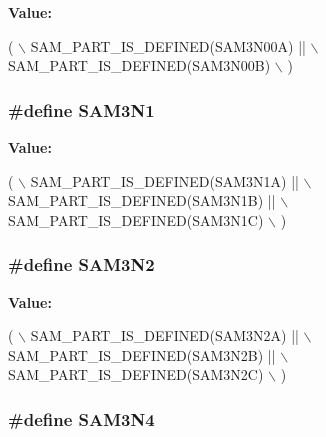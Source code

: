 {\bfseries Value\-:}
\begin{DoxyCode}
( \(\backslash\)
                SAM\_PART\_IS\_DEFINED(SAM3N00A) ||        \(\backslash\)
                SAM\_PART\_IS\_DEFINED(SAM3N00B) \(\backslash\)
                )
\end{DoxyCode}
\hypertarget{group__sam__part__macros__group_gaf58a7d141f31d6db97223dfd62d92905}{
\subsubsection[{S\-A\-M3\-N1}]{\setlength{\rightskip}{0pt plus 5cm}\#define S\-A\-M3\-N1}}\label{group__sam__part__macros__group_gaf58a7d141f31d6db97223dfd62d92905}
{\bfseries Value\-:}
\begin{DoxyCode}
( \(\backslash\)
                SAM\_PART\_IS\_DEFINED(SAM3N1A) || \(\backslash\)
                SAM\_PART\_IS\_DEFINED(SAM3N1B) || \(\backslash\)
                SAM\_PART\_IS\_DEFINED(SAM3N1C) \(\backslash\)
                )
\end{DoxyCode}
\hypertarget{group__sam__part__macros__group_ga96514eddac4935925994ef85ca9d12ac}{
\subsubsection[{S\-A\-M3\-N2}]{\setlength{\rightskip}{0pt plus 5cm}\#define S\-A\-M3\-N2}}\label{group__sam__part__macros__group_ga96514eddac4935925994ef85ca9d12ac}
{\bfseries Value\-:}
\begin{DoxyCode}
( \(\backslash\)
                SAM\_PART\_IS\_DEFINED(SAM3N2A) || \(\backslash\)
                SAM\_PART\_IS\_DEFINED(SAM3N2B) || \(\backslash\)
                SAM\_PART\_IS\_DEFINED(SAM3N2C) \(\backslash\)
                )
\end{DoxyCode}
\hypertarget{group__sam__part__macros__group_ga1d47bffd90ddbb0dac3874edbafb3803}{
\subsubsection[{S\-A\-M3\-N4}]{\setlength{\rightskip}{0pt plus 5cm}\#define S\-A\-M3\-N4}}\label{group__sam__part__macros__group_ga1d47bffd90ddbb0dac3874edbafb3803}
